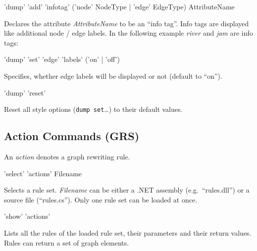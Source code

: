 \begin{rail}
  'dump' 'add' 'infotag' ('node' NodeType | 'edge' EdgeType) AttributeName
\end{rail}
Declares the attribute \emph{AttributeName} to be an ``info tag''. Info tags are displayed like additional node / edge labels. In the following example \emph{river} and \emph{jam} are info tags:
\begin{center}
\end{center}


\begin{rail}
  'dump' 'set' 'edge' 'labels' ('on' | 'off')
\end{rail}
Specifies, whether edge labels will be displayed or not (default to ``on'').

\begin{rail}
  'dump' 'reset'
\end{rail}
Reset all style options (\texttt{dump set}\dots) to their default values.

\subsection{Action Commands (GRS)}
\label{grsthings}
An \emph{action} denotes a graph rewriting rule.

\begin{rail}
  'select' 'actions' Filename
\end{rail}
Selects a rule set. \emph{Filename} can be either a .NET assembly (e.g.\ ``rules.dll'') or a source file (``rules.cs''). Only one rule set can be loaded at once.

\begin{rail}
  'show' 'actions'
\end{rail}
Lists all the rules of the loaded rule set, their parameters and their return values. Rules can return a set of graph elements.

